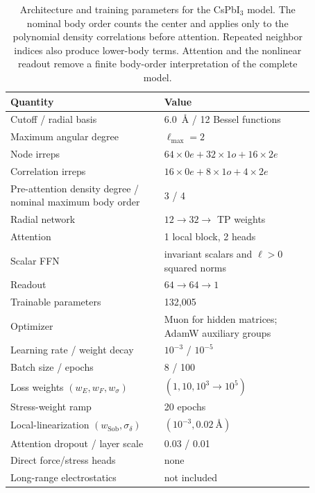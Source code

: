 \documentclass[aps,prx,preprint,notitlepage,superscriptaddress,nofootinbib,floatfix]{revtex4-2}
\renewcommand{\arraystretch}{1.15}
\begin{document}
\begin{table}[p]
\centering
\small
\renewcommand{\arraystretch}{1.12}
\begin{tabular}{p{0.44\linewidth}p{0.43\linewidth}}
\toprule
Quantity & Value \\
\midrule
Cutoff / radial basis & 6.0~\AA{} / 12 Bessel functions \\
Maximum angular degree & $\ell_{\max}=2$ \\
Node irreps & $64\times0e+32\times1o+16\times2e$ \\
Correlation irreps & $16\times0e+8\times1o+4\times2e$ \\
{\raggedright Pre-attention density degree / nominal maximum body order\par}
  & 3 / 4 \\
Radial network & $12\rightarrow32\rightarrow$ TP weights \\
Attention & 1 local block, 2 heads \\
Scalar FFN & invariant scalars and $\ell>0$ squared norms \\
Readout & $64\rightarrow64\rightarrow1$ \\
Trainable parameters & 132,005 \\
Optimizer & Muon for hidden matrices; AdamW auxiliary groups \\
Learning rate / weight decay & $10^{-3}$ / $10^{-5}$ \\
Batch size / epochs & 8 / 100 \\
Loss weights $(w_E,w_F,w_\sigma)$ & $(1,10,10^3\rightarrow10^5)$ \\
Stress-weight ramp & 20 epochs \\
Local-linearization $(w_{\mathrm{Sob}},\sigma_\delta)$ & $(10^{-3},0.02~\text{\AA})$ \\
Attention dropout / layer scale & 0.03 / 0.01 \\
Direct force/stress heads & none \\
Long-range electrostatics & not included \\
\bottomrule
\end{tabular}
\caption{Architecture and training parameters for the CsPbI$_3$ model. The nominal body order counts the center and applies only to the polynomial density correlations before attention. Repeated neighbor indices also produce lower-body terms. Attention and the nonlinear readout remove a finite body-order interpretation of the complete model.}
\label{tab:cspbi3-architecture}
\end{table}
\FloatBarrier
\end{document}
